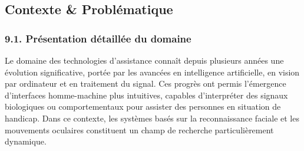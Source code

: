 \documentclass[
]{article}
\begin{document}
\hypertarget{section-29}{%
\subsection{}\label{section-29}}

\hypertarget{section-30}{%
\subsection{}\label{section-30}}

\hypertarget{section-31}{%
\subsection{}\label{section-31}}

\hypertarget{section-32}{%
\subsection{}\label{section-32}}

\hypertarget{section-33}{%
\subsection{}\label{section-33}}

\hypertarget{section-34}{%
\subsection{}\label{section-34}}

\hypertarget{section-35}{%
\subsection{}\label{section-35}}

\hypertarget{contexte-probluxe9matique}{%
\subsection{Contexte \& Problématique}\label{contexte-probluxe9matique}}

\hypertarget{pruxe9sentation-duxe9tailluxe9e-du-domaine}{%
\subsubsection{9.1. Présentation détaillée du domaine}\label{pruxe9sentation-duxe9tailluxe9e-du-domaine}}

Le domaine des technologies d'assistance connaît depuis plusieurs années une évolution significative, portée par les avancées en intelligence artificielle, en vision par ordinateur et en traitement du signal. Ces progrès ont permis l'émergence d'interfaces homme-machine plus intuitives, capables d'interpréter des signaux biologiques ou comportementaux pour assister des personnes en situation de handicap. Dans ce contexte, les systèmes basés sur la reconnaissance faciale et les mouvements oculaires constituent un champ de recherche particulièrement dynamique.
\end{document}
